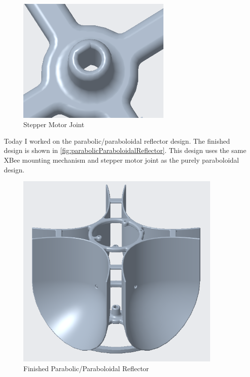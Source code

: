 \documentclass[fontsize=11pt, %
                             paper=letter, %
                             openany, %
                             captions=tableheading,
                             index=totoc,
                             hyperref]{labbook}
\begin{document}
\begin{addmargin}[0cm]{0cm}
\begin{figure}[h!]
    \center
    \includegraphics[width=3in]{figs/img/stepperMotorPressFitJoint.png}
    \caption{Stepper Motor Joint}
    \label{fig:stepperMotorPressFitJoint}
\end{figure}


%
Today I worked on the parabolic/paraboloidal reflector design. The finished design is shown in \autoref{fig:parabolicParaboloidalReflector}. This design uses the same XBee mounting mechanism and stepper motor joint as the purely paraboloidal design.

\begin{figure}[h!]
    \center
    \includegraphics[width=4in]{figs/img/parabolicParaboloidalReflector.png}
    \caption{Finished Parabolic/Paraboloidal Reflector}
    \label{fig:parabolicParaboloidalReflector}
\end{figure}


\end{addmargin}
\end{document}
